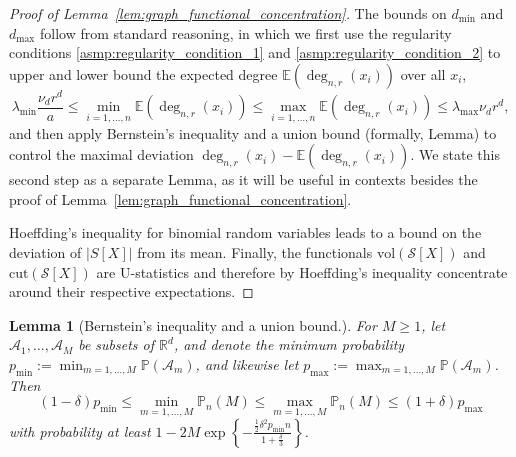 \documentclass[11pt,twoside]{article}
\newtheorem{lemma}{Lemma}
\newcommand{\vol}{\mathrm{vol}}
\newcommand{\abs}[1]{\left \lvert #1 \right \rvert}
\newcommand{\Reals}{\mathbb{R}}
\newcommand{\1}{\mathbf{1}}
\newcommand{\Pbb}{\mathbb{P}}
\begin{document}
\begin{proof}[Proof of Lemma~\ref{lem:graph_functional_concentration}]
The bounds on $d_{\min}$ and $d_{\max}$ follow from standard reasoning, in which we first use the regularity conditions \ref{asmp:regularity_condition_1} and \ref{asmp:regularity_condition_2} to upper and lower bound the expected degree $\mathbb{E}(\deg_{n,r}(x_i))$ over all $x_i$,
\begin{equation*}
\lambda_{\min} \frac{\nu_d r^d}{a} \leq \min_{i = 1,\ldots,n} \mathbb{E}(\deg_{n,r}(x_i)) \leq \max_{i = 1,\ldots,n} \mathbb{E}(\deg_{n,r}(x_i)) \leq \lambda_{\max} \nu_d r^d,
\end{equation*}
and then apply Bernstein's inequality and a union bound (formally, Lemma) to control the maximal deviation $\deg_{n,r}(x_i) - \mathbb{E}(\deg_{n,r}(x_i))$. We state this second step as a separate Lemma, as it will be useful in contexts besides the proof of Lemma~\ref{lem:graph_functional_concentration}.

Hoeffding's inequality for binomial random variables leads to a bound on the deviation of $\abs{S[X]}$ from its mean. Finally, the functionals $\vol(\mathcal{S}[X])$ and $\mathrm{cut}(\mathcal{S}[X])$ are U-statistics and therefore by Hoeffding's inequality concentrate around their respective expectations.
\end{proof}

\begin{lemma}[Bernstein's inequality and a union bound.]
	For $M \geq 1$, let $\mathcal{A}_1,\ldots,\mathcal{A}_M$ be subsets of $\Reals^d$, and denote the minimum probability $p_{\min} := \min_{m = 1,\ldots,M} \Pbb(\mathcal{A}_m)$, and likewise let $p_{\max} := \max_{m = 1,\ldots,M} \Pbb(\mathcal{A}_m)$. Then
	\begin{equation*}
	(1 - \delta)p_{\min} \leq \min_{m = 1,\ldots,M} \Pbb_n(M) \leq \max_{m = 1,\ldots,M} \Pbb_n(M) \leq (1 + \delta)p_{\max}
	\end{equation*}
	with probability at least $1 - 2 M \exp\left\{-\frac{\frac{1}{2}\delta^2p_{\min}n}{1 + \frac{\delta}{3}}\right\}$. 
\end{lemma}
\end{document}
